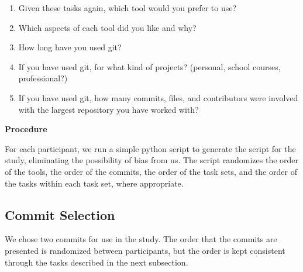 \begin{enumerate}
  \item Given these tasks again, which tool would you prefer to use?
  \item Which aspects of each tool did you like and why?
  \item How long have you used git?
  \item If you have used git, for what kind of projects? (personal,
    school courses, professional?)
  \item If you have used git, how many commits, files, and contributors
    were involved with the largest repository you have worked with?
\end{enumerate}


\textbf{Procedure}




For each participant, we run a simple python script to generate the
script for the study, eliminating the possibility of bias from us. The
script randomizes the order of the tools, the order of the commits, the
order of the task sets, and the order of the tasks within each task set,
where appropriate.


\subsection{Commit Selection}
\label{sub:commit_selection}


We chose two commits for use in the study. The order that the commits
are presented is randomized between participants, but the order is kept
consistent through the tasks described in the next subsection.

